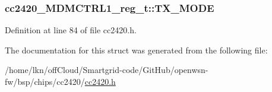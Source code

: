 \subsubsection[{\texorpdfstring{T\+X\+\_\+\+M\+O\+DE}{TX_MODE}}]{ cc2420\+\_\+\+M\+D\+M\+C\+T\+R\+L1\+\_\+reg\+\_\+t\+::\+T\+X\+\_\+\+M\+O\+DE}\hypertarget{structcc2420___m_d_m_c_t_r_l1__reg__t_aa74bf932402f2d9eed73e579d64634f8}{}\label{structcc2420___m_d_m_c_t_r_l1__reg__t_aa74bf932402f2d9eed73e579d64634f8}


Definition at line 84 of file cc2420.\+h.



The documentation for this struct was generated from the following file\+:\begin{DoxyCompactItemize}
\item 
/home/lkn/off\+Cloud/\+Smartgrid-\/code/\+Git\+Hub/openwsn-\/fw/bsp/chips/cc2420/\hyperlink{cc2420_8h}{cc2420.\+h}\end{DoxyCompactItemize}

